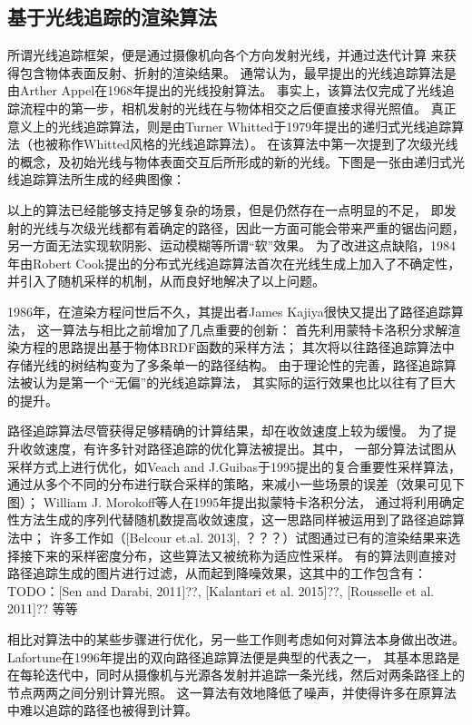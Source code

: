 \subsection{基于光线追踪的渲染算法}

所谓光线追踪框架，便是通过摄像机向各个方向发射光线，并通过迭代计算
来获得包含物体表面反射、折射的渲染结果。
通常认为，最早提出的光线追踪算法是由Arther Appel在1968年提出的光线投射算法\cite{RayCasting}。
事实上，该算法仅完成了光线追踪流程中的第一步，相机发射的光线在与物体相交之后便直接求得光照值。
真正意义上的光线追踪算法，则是由Turner Whitted于1979年提出的递归式光线追踪算法\cite{WhittedRayTracing}（也被称作Whitted风格的光线追踪算法）。
在该算法中第一次提到了次级光线的概念，及初始光线与物体表面交互后所形成的新的光线。下图是一张由递归式光线追踪算法所生成的经典图像：

以上的算法已经能够支持足够复杂的场景，但是仍然存在一点明显的不足，
即发射的光线与次级光线都有着确定的路径，因此一方面可能会带来严重的锯齿问题，
另一方面无法实现软阴影、运动模糊等所谓“软”效果。
为了改进这点缺陷，1984年由Robert Cook提出的分布式光线追踪算法\cite{DistributiveRayTracing}首次在光线生成上加入了不确定性，
并引入了随机采样的机制，从而良好地解决了以上问题。

1986年，在渲染方程问世后不久，其提出者James Kajiya很快又提出了路径追踪算法\cite{PathTracing}，
这一算法与相比之前增加了几点重要的创新：
首先利用蒙特卡洛积分求解渲染方程的思路提出基于物体BRDF函数的采样方法；
其次将以往路径追踪算法中存储光线的树结构变为了多条单一的路径结构。
由于理论性的完善，路径追踪算法被认为是第一个“无偏”的光线追踪算法，
其实际的运行效果也比以往有了巨大的提升。

路径追踪算法尽管获得足够精确的计算结果，却在收敛速度上较为缓慢。
为了提升收敛速度，有许多针对路径追踪的优化算法被提出。其中，
一部分算法试图从采样方式上进行优化，如Veach and J.Guibas于1995提出的复合重要性采样\cite{MultipleImportanceSampling}算法，
通过从多个不同的分布进行联合采样的策略，来减小一些场景的误差（效果可见下图）；
William J. Morokoff等人在1995年提出拟蒙特卡洛积分法\cite{QuasiMonteCarlo}，
通过将利用确定性方法生成的序列代替随机数提高收敛速度，这一思路同样被运用到了路径追踪算法中；
许多工作如（[Belcour et.al. 2013], ？？？）试图通过已有的渲染结果来选择接下来的采样密度分布，这些算法又被统称为适应性采样。
有的算法则直接对路径追踪生成的图片进行过滤，从而起到降噪效果，这其中的工作包含有：
TODO：[Sen and Darabi, 2011]??, [Kalantari et al. 2015]??, [Rousselle et al. 2011]??
等等

相比对算法中的某些步骤进行优化，另一些工作则考虑如何对算法本身做出改进。
Lafortune在1996年提出的双向路径追踪算法\cite{BidirectionalPathTracing}便是典型的代表之一，
其基本思路是在每轮迭代中，同时从摄像机与光源各发射并追踪一条光线，然后对两条路径上的节点两两之间分别计算光照。
这一算法有效地降低了噪声，并使得许多在原算法中难以追踪的路径也被得到计算。

